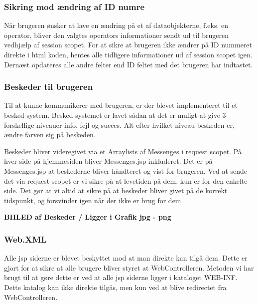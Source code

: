 \documentclass[a4paper]{article}
\begin{document}
\subsubsection{Sikring mod ændring af ID numre} %

Når brugeren ønsker at lave en ændring på et af dataobjekterne, f.eks. en operator, bliver den valgtes operators informationer sendt ud til brugeren vedhjælp af session scopet. For at sikre at brugeren ikke ændrer på ID nummeret direkte i html koden, hentes alle tidligere informationer ud af session scopet igen.  Dernæst opdateres alle andre felter end ID feltet med det brugeren har indtastet.


\subsubsection{Beskeder til brugeren} %

Til at kunne kommunikerer med brugeren, er der blevet implementeret til et besked system. Besked systemet er lavet sådan at det er muligt at give 3 forskellige niveauer info, fejl og succes. Alt efter hvilket niveau beskeden er, ændre farven sig på beskeden. 

Beskeder bliver videregivet via et Arraylists af Messenges i request scopet. På hver side på hjemmesiden bliver Messenges.jsp inkluderet. Det er på Messenges.jsp at beskederne bliver håndteret og vist for brugeren. Ved at sende det via request scopet er vi sikre på at levetiden på dem, kun er for den enkelte side. Det gør at vi altid at sikre på at beskeder bliver givet på de korrekt tidspunkt, og forsvinder igen når der ikke er brug for dem.

\textbf{BIILED af Beskeder / Ligger i Grafik jpg - png}


\subsubsection{Web.XML} %

Alle jsp siderne er blevet beskyttet mod at man direkte kan tilgå dem. Dette er gjort for at sikre at alle brugere bliver styret at WebControlleren. Metoden vi har brugt til at gøre dette er ved at alle jsp siderne ligger i kataloget WEB-INF. Dette katalog kan ikke direkte tilgås, men kun ved at blive redirectet fra WebControlleren. 
\end{document}
